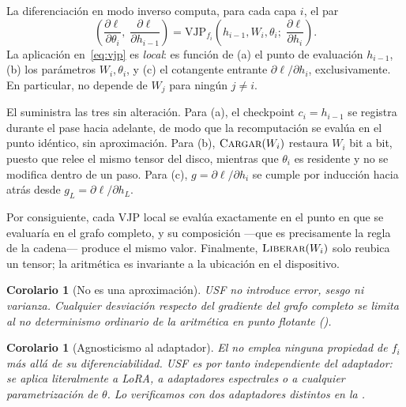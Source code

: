 \documentclass[journal]{IEEEtran}
\newtheorem{corollary}[theorem]{Corolario}
\newcommand{\usf}{USF}
\newcommand{\VJP}{\mathrm{VJP}}
\begin{document}
\begin{IEEEproof}
La diferenciación en modo inverso computa, para cada capa $i$, el par
\begin{equation}
\label{eq:vjp}
\left(\frac{\partial\ell}{\partial\theta_i},\; \frac{\partial\ell}{\partial h_{i-1}}\right)
= \VJP_{f_i}\!\left(h_{i-1}, W_i, \theta_i;\; \frac{\partial\ell}{\partial h_i}\right).
\end{equation}
La aplicación en~\eqref{eq:vjp} es \emph{local}: es función de (a) el punto de evaluación
$h_{i-1}$, (b) los parámetros $W_i,\theta_i$, y (c) el cotangente entrante
$\partial\ell/\partial h_i$, exclusivamente. En particular, no depende de $W_j$ para ningún
$j \neq i$.

El  suministra las tres sin alteración. Para (a), el checkpoint $c_i = h_{i-1}$ se
registra durante el pase hacia adelante, de modo que la recomputación se evalúa en el punto
idéntico, sin aproximación. Para (b), $\textsc{Cargar}(W_i)$ restaura $W_i$ bit a bit, puesto que
relee el mismo tensor del disco, mientras que $\theta_i$ es residente y no se modifica dentro de un
paso. Para (c), $g=\partial\ell/\partial h_i$ se cumple por inducción hacia atrás desde
$g_L = \partial\ell/\partial h_L$.

Por consiguiente, cada VJP local se evalúa exactamente en el punto en que se evaluaría en el grafo
completo, y su composición ---que es precisamente la regla de la cadena--- produce el mismo valor.
Finalmente, $\textsc{Liberar}(W_i)$ solo reubica un tensor; la aritmética es invariante a la
ubicación en el dispositivo.
\end{IEEEproof}

\begin{corollary}[No es una aproximación]
\label{cor:noapprox}
\usf{} no introduce error, sesgo ni varianza. Cualquier desviación respecto del gradiente del grafo
completo se limita al no determinismo ordinario de la aritmética en punto flotante
().
\end{corollary}

\begin{corollary}[Agnosticismo al adaptador]
\label{cor:agnostic}
El  no emplea ninguna propiedad de $f_i$ más allá de su diferenciabilidad. \usf{}
es por tanto independiente del adaptador: se aplica literalmente a LoRA, a adaptadores espectrales
o a cualquier parametrización de $\theta$. Lo verificamos con dos adaptadores distintos en la
.
\end{corollary}
\end{document}
